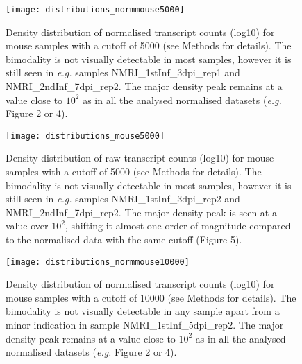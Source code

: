 \documentclass{article}
\begin{document}
\begin{figure}[h]
\begin{center}
\texttt{[image: distributions\_normmouse5000]} %
\caption{Density distribution of normalised transcript counts (log10) for mouse samples with a cutoff of 5000 (see Methods for details). The bimodality is not visually detectable in most samples, however it is still seen in \textit{e.g.} samples NMRI\_1stInf\_3dpi\_rep1 and NMRI\_2ndInf\_7dpi\_rep2. The major density peak remains at a value close to $10^2$ as in all the analysed normalised datasets (\textit{e.g.} Figure 2 or 4).}
\end{center}
\end{figure}

\begin{figure}[h]
\begin{center}
\texttt{[image: distributions\_mouse5000]} %
\caption{Density distribution of raw transcript counts (log10) for mouse samples with a cutoff of 5000 (see Methods for details). The bimodality is not visually detectable in most samples, however it is still seen in \textit{e.g.} samples NMRI\_1stInf\_3dpi\_rep2 and NMRI\_2ndInf\_7dpi\_rep2. The major density peak is seen at a value over $10^2$, shifting it almost one order of magnitude compared to the normalised data with the same cutoff (Figure 5).}
\end{center}
\end{figure}

\begin{figure}[h]
\begin{center}
\texttt{[image: distributions\_normmouse10000]} %
\caption{Density distribution of normalised transcript counts (log10) for mouse samples with a cutoff of 10000 (see Methods for details). The bimodality is not visually detectable in any sample apart from a minor indication in sample NMRI\_1stInf\_5dpi\_rep2. The major density peak remains at a value close to $10^2$ as in all the analysed normalised datasets (\textit{e.g.} Figure 2 or 4).}
\end{center}
\end{figure}


\end{document}
